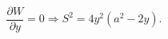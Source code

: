\begin{equation}
        \frac{\partial W}{\partial y} = 0 \Rightarrow S^2= 4 y^2 (a^2 - 2 y)
	\label{eq:yandS}.
\end{equation}

